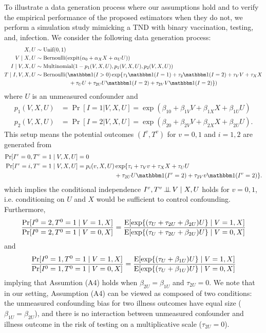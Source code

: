\documentclass[11pt]{article}
\begin{document}
To illustrate a data generation process where our assumptions hold and to verify the empirical performance of the proposed estimators when they do not, we perform a simulation study mimicking a TND with binary vaccination, testing, and, infection. We consider the following data generation process:
\begin{align*}
    X, U &\sim \text{Unif}(0,1)\\
    V\mid X, U & \sim \text{Bernoulli}(\expit(\alpha_0 + \alpha_X X + \alpha_U U))\\
    I \mid V, X, U &\sim \text{Multinomial}(1-p_1(V, X, U), p_1(V, X, U), p_2(V, X, U))\\
    T\mid I, V, X, U &\sim \text{Bernoulli}(\mathbbm 1(I>0)\exp\{\tau_{1}\mathbbm 1(I=1) + \tau_{2}\mathbbm 1(I=2) + \tau_V V + \tau_X X \\&\qquad \qquad\qquad + \tau_U U + \tau_{2U} U \mathbbm 1(I=2) + \tau_{2V} V \mathbbm 1(I=2) \})
\end{align*}
where $U$ is an unmeasured confounder and
\begin{align*}
    p_1(V, X, U) & = \Pr[I = 1 | V, X, U] = \exp(\beta_{10} + \beta_{1V}V + \beta_{1X}X + \beta_{1U}U) \\
    p_2(V, X, U) & = \Pr[I = 2 | V, X, U] = \exp(\beta_{20} + \beta_{2V}V + \beta_{2X}X + \beta_{2U}U).
\end{align*}
This setup means the potential outcomes $(I^v, T^v)$ for $v=0,1$ and $i=1, 2$ are generated from
\begin{align*}
    \Pr[I^v=0, T^v=1\mid V, X, U] &= 0\\
    \Pr[I^v=i, T^v=1\mid V, X, U] &= p_i(v, X, U)\exp\{\tau_i + \tau_V v + \tau_X X + \tau_U U \\&\qquad \qquad\qquad + \tau_{2U}U\mathbbm 1(I^v=2) + \tau_{2V} v \mathbbm 1(I^v=2) \}.
\end{align*}
which implies the conditional independence $I^v, T^v\operatorname{\perp\!\!\!\perp} V\mid X, U$ holds for $v=0,1$, i.e. conditioning on $U$ and $X$ would be sufficient to control confounding. Furthermore, 
\begin{align*}
    \dfrac{\Pr[I^0=2, T^0=1 \mid V=1,X]}{\Pr[I^0=2, T^0=1\mid V=0,X]}=\dfrac{\operatorname{E}[\exp\{(\tau_U  + \tau_{2U}+\beta_{2U})U\}\mid V=1, X]}{\operatorname{E}[\exp\{(\tau_U  + \tau_{2U}+\beta_{2U})U\}\mid V=0, X]}
\end{align*}
and 
\begin{align*}
    \dfrac{\Pr[I^0=1, T^0=1 \mid V=1,X]}{\Pr[I^0=1, T^0=1\mid V=0,X]}=\dfrac{\operatorname{E}[\exp\{(\tau_U  +\beta_{1U})U\}\mid V=1, X]}{\operatorname{E}[\exp\{(\tau_U +\beta_{1U})U\}\mid V=0, X]}
\end{align*}
implying that Assumtion (A4) holds when $\beta_{2U}=\beta_{1U}$ and $\tau_{2U}=0$. We note that in our setting, Assumption (A4) can be viewed as composed of two conditions: the unmeasured confounding bias for two illness outcomes have equal size ($\beta_{1U}=\beta_{2U}$), and there is no interaction between unmeasured confounder and illness outcome in the risk of testing on a multiplicative scale ($\tau_{2U}=0$).
\end{document}
